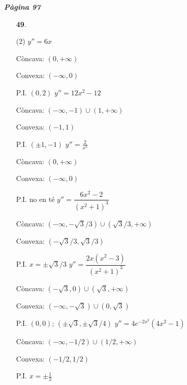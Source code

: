 \documentclass[a4paper, pdf, twoside]{book}
\begin{document}

{\textbf{\em Pàgina 97}} \hrulefill
\begin{enumerate}
\vspace{0.25cm}



 \item[\fontfamily{phv}\selectfont\color{blue}\textbf{49}. ] 
 \begin{tasks}[column-sep=1em, item-indent=1.3333em](2)
	 \task $y''=6x$\par Còncava: $(0,+\infty )$ \par Convexa: $(-\infty ,0)$ \par P.I. $(0,2)$
	 \task $y''=12x^2-12$\par Còncava: $(-\infty ,-1)\cup (1,+\infty )$ \par Convexa: $(-1,1)$ \par P.I. $(\pm 1,-1)$
	 \task $y''=\frac {2}{x^3}$\par Còncava: $(0,+\infty )$ \par Convexa: $(-\infty ,0)$ \par P.I. no en té
	 \task $y''=\dfrac {6x^2-2}{(x^2+1)^3}$\par Còncava: $(-\infty ,-\sqrt {3}/3)\cup (\sqrt {3}/3,+\infty )$ \par Convexa: $(-\sqrt {3}/3,\sqrt {3}/3)$ \par P.I. $x=\pm \sqrt {3}/3$
	 \task $y''=\dfrac {2x(x^2-3)}{(x^2+1)^3}$\par Còncava: $(-\sqrt {3},0)\cup (\sqrt {3},+\infty )$ \par Convexa: $(-\infty ,-\sqrt {3})\cup (0,\sqrt {3})$ \par P.I. $(0,0)$; $(\pm \sqrt {3},\pm \sqrt {3}/4)$
	 \task $y''=4e^{-2x^2}(4x^2-1)$\par Còncava: $(-\infty ,-1/2)\cup (1/2,+\infty )$ \par Convexa: $(-1/2,1/2)$ \par P.I. $x=\pm \frac {1}{2}$
\end{tasks}
 \end{enumerate}
\vspace{0.3cm}

\end{document}
